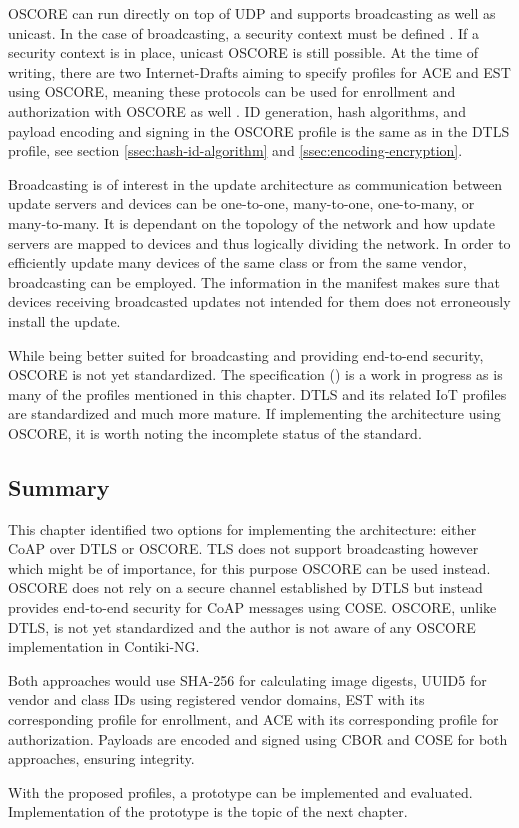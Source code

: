\documentclass[0-thesis.tex]{subfiles}
\begin{document}
OSCORE can run directly on top of UDP and supports broadcasting as well as unicast. In the
case of broadcasting, a security context must be defined \parencite{oscore-group}. If a
security context is in place, unicast OSCORE is still possible. At the time of writing,
there are two Internet-Drafts aiming to specify profiles for ACE and EST using OSCORE,
meaning these protocols can be used for enrollment and authorization with OSCORE as well
\parencite{ace-oscore, est-oscore}. ID generation, hash algorithms, and payload encoding
and signing in the OSCORE profile is the same as in the DTLS profile, see section
\ref{ssec:hash-id-algorithm} and \ref{ssec:encoding-encryption}.

Broadcasting is of interest in the update architecture as communication between update
servers and devices can be one-to-one, many-to-one, one-to-many, or many-to-many. It is
dependant on the topology of the network and how update servers are mapped to devices and
thus logically dividing the network. In order to efficiently update many devices of the
same class or from the same vendor, broadcasting can be employed. The information in the
manifest makes sure that devices receiving broadcasted updates not intended for them does
not erroneously install the update.

While being better suited for broadcasting and providing end-to-end security, OSCORE is
not yet standardized. The specification (\parencite{oscore}) is a work in progress as is
many of the profiles mentioned in this chapter. DTLS and its related IoT profiles are
standardized and much more mature. If implementing the architecture using OSCORE, it is
worth noting the incomplete status of the standard.

\subsection{Summary}
\label{sec:5-summary}
This chapter identified two options for implementing the architecture: either CoAP over
DTLS or OSCORE. TLS does not support broadcasting however which might be of importance,
for this purpose OSCORE can be used instead. OSCORE does not rely on a secure channel
established by DTLS but instead provides end-to-end security for CoAP messages using COSE.
OSCORE, unlike DTLS, is not yet standardized and the author is not aware of any OSCORE
implementation in Contiki-NG. 

Both approaches would use SHA-256 for calculating image digests, UUID5 for vendor and
class IDs using registered vendor domains, EST with its corresponding profile for
enrollment, and ACE with its corresponding profile for authorization. Payloads are encoded
and signed using CBOR and COSE for both approaches, ensuring integrity.

With the proposed profiles, a prototype can be implemented and evaluated. Implementation
of the prototype is the topic of the next chapter.
\end{document}
